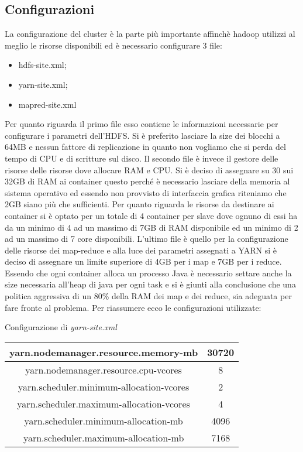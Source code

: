 \subsection{Configurazioni}
La configurazione del cluster è la parte più importante affinchè hadoop utilizzi al meglio le risorse disponibili ed è necessario configurare 3 file:
\begin{itemize}
\item hdfs-site.xml;
\item yarn-site.xml;
\item mapred-site.xml
\end{itemize}
Per quanto riguarda il primo file esso contiene le informazioni necessarie per configurare i parametri dell'HDFS. Si è preferito lasciare la size dei blocchi a 64MB e nessun fattore di replicazione in quanto non vogliamo che si perda del tempo di CPU e di scritture sul disco. Il secondo file è invece il gestore delle risorse delle risorse dove allocare RAM e CPU. Si è deciso di assegnare su 30 sui 32GB di RAM ai container questo perché è necessario lasciare della memoria al sistema operativo ed essendo non provvisto di interfaccia grafica riteniamo che 2GB siano più che sufficienti. Per quanto riguarda le risorse da destinare ai container si è optato per un totale di 4 container per slave dove ognuno di essi ha da un minimo di 4 ad un massimo di 7GB di RAM disponibile ed un minimo di 2 ad un massimo di 7 core disponibili. L'ultimo file è quello per la configurazione delle risorse dei map-reduce e alla luce dei parametri assegnati a YARN si è deciso di assegnare un limite superiore di 4GB per i map e 7GB per i reduce. Essendo che ogni container alloca un processo Java è necessario settare anche la size necessaria all'heap di java per ogni task e si è giunti alla conclusione che una politica aggressiva di un 80\% della RAM dei map e dei reduce, sia adeguata per fare fronte al problema. Per riassumere ecco le configurazioni utilizzate:
\begin{center}
Configurazione di \textit{yarn-site.xml} \\
\begin{tabular}{ | c | c |} 
\hline
yarn.nodemanager.resource.memory-mb & 30720 \\ 
\hline
yarn.nodemanager.resource.cpu-vcores & 8 \\ 
\hline
yarn.scheduler.minimum-allocation-vcores & 2 \\
\hline
yarn.scheduler.maximum-allocation-vcores & 4 \\ 
\hline
yarn.scheduler.minimum-allocation-mb & 4096 \\
\hline
yarn.scheduler.maximum-allocation-mb & 7168 \\
\hline
\end{tabular}
\end{center}

